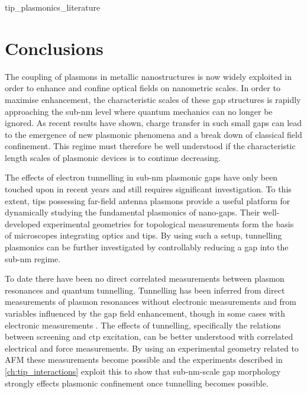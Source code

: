 \documentclass[12pt, a4paper, oneside]{book}
\begin{document}
{tip_plasmonics_literature}

\section{Conclusions}

The coupling of plasmons in metallic nanostructures is now widely exploited in order to enhance and confine optical fields on nanometric scales. In order to maximise enhancement, the characteristic scales of these gap structures is rapidly approaching the sub-nm level where quantum mechanics can no longer be ignored. As recent results have shown, charge transfer in such small gaps can lead to the emergence of new plasmonic phenomena and a break down of classical field confinement. This regime must therefore be well understood if the characteristic length scales of plasmonic devices is to continue decreasing.

The effects of electron tunnelling in sub-nm plasmonic gaps have only been touched upon in recent years and still requires significant investigation. To this extent, tips possessing far-field antenna plasmons provide a useful platform for dynamically studying the fundamental plasmonics of nano-gaps. Their well-developed experimental geometries for topological measurements form the basis of microscopes integrating optics and tips. By using such a setup, tunnelling plasmonics can be further investigated by controllably reducing a gap into the sub-nm regime.

To date there have been no direct correlated measurements between plasmon resonances and quantum tunnelling. Tunnelling has been inferred from direct measurements of plasmon resonances without electronic measurements \cite{savage2012, scholl2013} and from variables influenced by the gap field enhancement, though in some cases with electronic measurements \cite{tan2014, zhu2014, hajisalem2014, cha2014}. The effects of tunnelling, specifically the relations between screening and \gls{ctp} excitation, can be better understood with correlated electrical and force measurements. By using an experimental geometry related to AFM these measurements become possible and the experiments described in \autoref{ch:tip_interactions} exploit this to show that sub-nm-scale gap morphology strongly effects plasmonic confinement once tunnelling becomes possible.

\ifstandalone
\begin{singlespace}
\fontsize{8pt}{1em}\selectfont
\printbibliography[notcategory=fullcited]
\end{singlespace}
\fi
\end{document}
